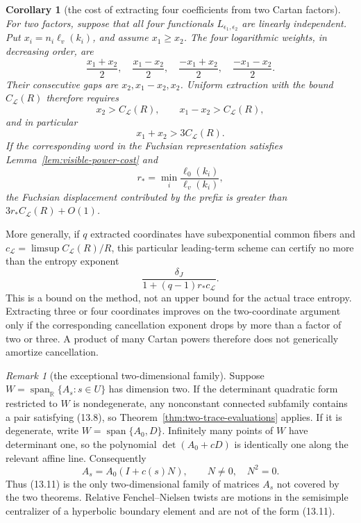 \documentclass[11pt,reqno]{amsart}
\newtheorem{corollary}[theorem]{Corollary}
\theoremstyle{definition}
\theoremstyle{remark}
\newtheorem{remark}[theorem]{Remark}
\newcommand{\R}{\mathbb R}
\newcommand{\Span}{\operatorname{span}}
\begin{document}
\begin{corollary}[the cost of extracting four coefficients from two Cartan factors]
\label{cor:four-coordinate-cost}
For two factors, suppose that all four functionals
\(L_{\epsilon_1,\epsilon_2}\) are linearly independent.  Put
\(x_i=n_i\ell_v(k_i)\), and assume \(x_1\ge x_2\).  The four logarithmic
weights, in decreasing order, are
\[
 \frac{x_1+x_2}{2},\quad
 \frac{x_1-x_2}{2},\quad
 \frac{-x_1+x_2}{2},\quad
 \frac{-x_1-x_2}{2}.
\]
Their consecutive gaps are \(x_2,x_1-x_2,x_2\).  Uniform extraction with
the bound \(C_{\mathcal L}(R)\) therefore requires
\[
 x_2>C_{\mathcal L}(R),\qquad
 x_1-x_2>C_{\mathcal L}(R),
\]
and in particular
\[
 x_1+x_2>3C_{\mathcal L}(R).
\]
If the corresponding word in the Fuchsian representation satisfies
Lemma~\ref{lem:visible-power-cost} and
\[
 r_*=\min_i\frac{\ell_0(k_i)}{\ell_v(k_i)},
\]
the Fuchsian displacement contributed by the prefix is greater than
\(3r_*C_{\mathcal L}(R)+O(1)\).
\end{corollary}

More generally, if \(q\) extracted coordinates have subexponential common
fibers and
\(c_{\mathcal L}=\limsup C_{\mathcal L}(R)/R\), this particular
leading-term scheme can certify no more than the entropy exponent
\[
 \frac{\delta_J}{1+(q-1)r_*c_{\mathcal L}}.
\]
This is a bound on the method, not an upper bound for the actual trace
entropy.  Extracting three or four coordinates improves on the
two-coordinate argument only if the corresponding cancellation exponent
drops by more than a factor of two or three.  A product of many Cartan
powers therefore does not generically amortize cancellation.

\begin{remark}[the exceptional two-dimensional family]
\label{rem:unipotent-pencil}
Suppose \(W=\Span_\R\{A_s:s\in U\}\) has dimension two.  If the determinant
quadratic form restricted to \(W\) is nondegenerate, any nonconstant
connected subfamily contains a pair satisfying (13.8), so
Theorem~\ref{thm:two-trace-evaluations} applies.  If it is degenerate, write
\(W=\Span\{A_0,D\}\).  Infinitely many points of \(W\) have determinant
one, so the polynomial \(\det(A_0+cD)\) is identically one along the
relevant affine line.  Consequently
\[
 A_s=A_0(I+c(s)N),\qquad N\ne0,\quad N^2=0.
\tag{13.11}
\]
Thus (13.11) is the only two-dimensional family of matrices \(A_s\) not
covered by the two theorems.  Relative Fenchel--Nielsen twists are
motions in the semisimple centralizer of a hyperbolic boundary element and
are not of the form (13.11).
\end{remark}
\end{document}
